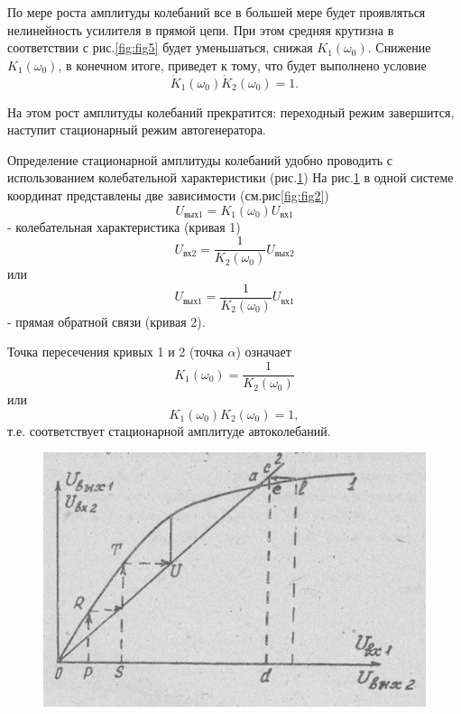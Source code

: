 По мере роста амплитуды колебаний все в большей мере будет проявляться нелинейность усилителя в прямой цепи. При этом средняя крутизна в соответствии с рис.\ref{fig:fig5} будет уменьшаться, снижая $K_1(\omega_0)$. Снижение $K_1(\omega_0)$, в конечном итоге, приведет к тому, что будет выполнено условие
\begin{equation*}
\dot{K}_1(\omega_0)\dot{K}_2(\omega_0)=1.
\end{equation*}

На этом рост амплитуды колебаний прекратится: переходный режим завершится, наступит стационарный режим автогенератора.

Определение стационарной амплитуды колебаний удобно проводить с использованием колебательной характеристики (рис.\ref{fig:fig8})
На рис.\ref{fig:fig8} в одной системе координат представлены две зависимости (см.рис\ref{fig:fig2}) 
\begin{equation*}
U_{\text{вых}1}=K_1(\omega_0)U_{\text{вх}1}
\end{equation*}
- колебательная характеристика (кривая 1)
\begin{equation*}
U_{\text{вх}2}=\frac{1}{K_2(\omega_0)}U_{\text{вых}2}
\end{equation*}
или
\begin{equation*}
U_{\text{вых}1}=\frac{1}{K_2(\omega_0)}U_{\text{вх}1}
\end{equation*}
- прямая обратной связи (кривая 2).

Точка пересечения кривых 1 и 2 (точка $\alpha$) означает
\begin{equation*}
K_1(\omega_0)=\frac{1}{K_2(\omega_0)}
\end{equation*}
или
\begin{equation}
K_1(\omega_0)K_2(\omega_0)=1,
\label{eq:7}
\end{equation}
т.е. соответствует стационарной амплитуде автоколебаний.

\begin{figure}[h]
	\centering
	\includegraphics[width=0.4\linewidth]{circuit/8.jpg}
	\caption{}
	\label{fig:fig8}
\end{figure}

